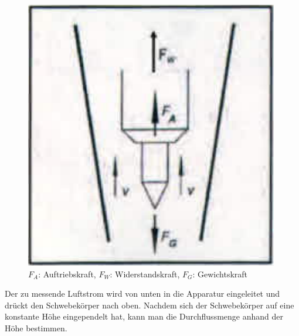 \begin{figure}[h]
\centering
\includegraphics[scale=0.6]{A2b.png}
\caption{$F_A$: Auftriebskraft, $F_W$: Widerstandskraft, $F_G$: Gewichtskraft}
\end{figure}

Der zu messende Luftstrom wird von unten in die Apparatur eingeleitet und drückt den Schwebekörper nach oben. Nachdem sich der Schwebekörper auf eine konstante Höhe eingependelt hat, kann man die Durchflussmenge anhand der Höhe bestimmen.



